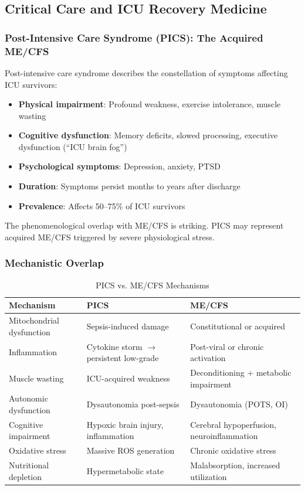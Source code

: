 \subsection{Critical Care and ICU Recovery Medicine}
\label{subsec:icu-recovery-parallel}

\subsubsection{Post-Intensive Care Syndrome (PICS): The Acquired ME/CFS}

Post-intensive care syndrome describes the constellation of symptoms affecting ICU survivors:

\begin{itemize}
    \item \textbf{Physical impairment}: Profound weakness, exercise intolerance, muscle wasting
    \item \textbf{Cognitive dysfunction}: Memory deficits, slowed processing, executive dysfunction (``ICU brain fog'')
    \item \textbf{Psychological symptoms}: Depression, anxiety, PTSD
    \item \textbf{Duration}: Symptoms persist months to years after discharge
    \item \textbf{Prevalence}: Affects 50--75\% of ICU survivors
\end{itemize}

The phenomenological overlap with ME/CFS is striking. PICS may represent acquired ME/CFS triggered by severe physiological stress.

\subsubsection{Mechanistic Overlap}

\begin{table}[htbp]
\centering
\caption{PICS vs. ME/CFS Mechanisms}
\label{tab:pics-mecfs-comparison}
\small
\begin{tabular}{p{4cm}p{5cm}p{5cm}}
\toprule
\textbf{Mechanism} & \textbf{PICS} & \textbf{ME/CFS} \\
\midrule
Mitochondrial dysfunction & Sepsis-induced damage & Constitutional or acquired \\
Inflammation & Cytokine storm $\rightarrow$ persistent low-grade & Post-viral or chronic activation \\
Muscle wasting & ICU-acquired weakness & Deconditioning + metabolic impairment \\
Autonomic dysfunction & Dysautonomia post-sepsis & Dysautonomia (POTS, OI) \\
Cognitive impairment & Hypoxic brain injury, inflammation & Cerebral hypoperfusion, neuroinflammation \\
Oxidative stress & Massive ROS generation & Chronic oxidative stress \\
Nutritional depletion & Hypermetabolic state & Malabsorption, increased utilization \\
\bottomrule
\end{tabular}
\end{table}


